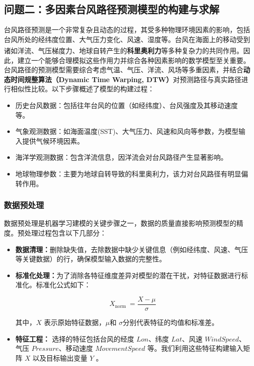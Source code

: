 \documentclass[withoutpreface,bwprint]{cumcmthesis}
\begin{document}
\subsection{问题二：多因素台风路径预测模型的构建与求解}

台风路径预测是一个非常复杂且动态的过程，其受多种物理环境因素的影响，包括台风所处的经纬度位置、大气压力变化、风速、湿度等。台风在海面上的移动受到诸如洋流、气压梯度力、地球自转产生的\textbf{科里奥利力}\textsuperscript{\cite{wie2012development}}等多种复杂力的共同作用。因此，建立一个能够合理模拟这些作用力并综合各种因素影响的数学模型至关重要。台风路径的预测模型需要综合考虑气温、气压、洋流、风场等多重因素，并结合\textbf{动态时间规整算法（Dynamic Time Warping, DTW）}对预测路径与真实路径进行相似性比较。以下步骤概述了模型的构建过程：

\begin{itemize}
    \item 历史台风数据：包括往年台风的位置（如经纬度）、台风强度及其移动速度等。

    \item 气象观测数据：如海面温度(SST)、大气压力、风速和风向等参数，为模型输入提供气候环境因素。

    \item 海洋学观测数据：包含洋流信息，因洋流会对台风路径产生显著影响。

    \item 地球物理参数：主要为地球自转导致的科里奥利力，该力对台风路径有明显偏转作用。
\end{itemize}

\subsubsection{数据预处理}

数据预处理是机器学习建模的关键步骤之一，数据的质量直接影响预测模型的精度。预处理过程包含以下几部分：

\begin{itemize}
    \item \textbf{数据清理：}删除缺失值，去除数据中缺少关键信息（例如经纬度、风速、气压等关键数据）的行，确保模型输入数据的完整性。

    \item \textbf{标准化处理：}为了消除各特征维度差异对模型的潜在干扰，对特征数据进行标准化。标准化公式如下：

                             \[X_{\text {norm }}=\frac{X-\mu}{\sigma}\]

                             其中，$X$ 表示原始特征数据，$\mu$和 $\sigma$分别代表特征的均值和标准差。

    \item \textbf{特征工程：}  选择的特征包括台风的经度 $Lon$、纬度 $Lat$、风速 $WindSpeed$、气压 $Pressure$、移动速度 $MovementSpeed$ 等。我们利用这些特征构建输入矩阵 $X$ 以及目标输出变量 $Y$ 。                  
\end{itemize}
\end{document}
